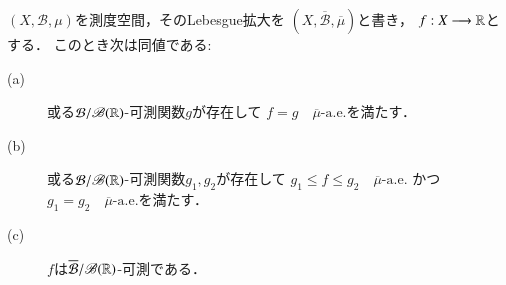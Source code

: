 		\begin{screen}
			\begin{thm}[拡大前後の可測性]\label{thm:measurability_before_after_Lebesgue_extension}
				$(X,\mathcal{B},\mu)$を測度空間，そのLebesgue拡大を
				$\left(X,\overline{\mathcal{B}},\overline{\mu}\right)$と書き，
				$f:X \longrightarrow \mathbb{R}$とする．
				このとき次は同値である:
				\begin{description}
					\item[(a)] 或る$\mathcal{B}/\mathscr{B}(\mathbb{R})$-可測関数$g$が存在して
						$f = g\quad \mbox{$\overline{\mu}$-a.e.}$を満たす．
					\item[(b)] 或る$\mathcal{B}/\mathscr{B}(\mathbb{R})$-可測関数$g_1,g_2$が存在して
						$g_1 \leq f \leq g_2\quad \mbox{$\overline{\mu}$-a.e.}$
						かつ$g_1 = g_2\quad \mbox{$\overline{\mu}$-a.e.}$を満たす．
					\item[(c)] $f$は$\overline{\mathcal{B}}/\mathscr{B}(\mathbb{R})$-可測である．
				\end{description}
			\end{thm}
		\end{screen}
		
